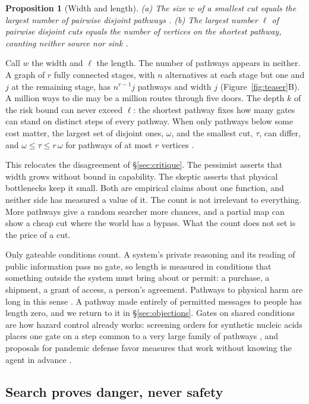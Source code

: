 \documentclass[10pt,twocolumn,letterpaper]{article}
\newtheorem{proposition}{Proposition}
\theoremstyle{definition}
\begin{document}
\begin{proposition}[Width and length]
\label{prop:graph}
(a) The size $w$ of a smallest cut equals the largest number of pairwise disjoint pathways \cite{menger,ford}. (b) The largest number $\ell$ of pairwise disjoint cuts equals the number of vertices on the shortest pathway, counting neither source nor sink \cite{robacker}.
\end{proposition}

Call $w$ the width and $\ell$ the length. The number of pathways appears in neither. A graph of $r$ fully connected stages, with $n$ alternatives at each stage but one and $j$ at the remaining stage, has $n^{r-1}j$ pathways and width $j$ (Figure~\ref{fig:teaser}B). A million ways to die may be a million routes through five doors. The depth $k$ of the risk bound can never exceed $\ell$: the shortest pathway fixes how many gates can stand on distinct steps of every pathway. When only pathways below some cost matter, the largest set of disjoint ones, $\omega$, and the smallest cut, $\tau$, can differ, and $\omega\le\tau\le r\,\omega$ for pathways of at most $r$ vertices \cite{lovasz}.

This relocates the disagreement of \S\ref{sec:critique}. The pessimist asserts that width grows without bound in capability. The skeptic asserts that physical bottlenecks keep it small. Both are empirical claims about one function, and neither side has measured a value of it. The count is not irrelevant to everything. More pathways give a random searcher more chances, and a partial map can show a cheap cut where the world has a bypass. What the count does not set is the price of a cut.

Only gateable conditions count. A system's private reasoning and its reading of public information pass no gate, so length is measured in conditions that something outside the system must bring about or permit: a purchase, a shipment, a grant of access, a person's agreement. Pathways to physical harm are long in this sense \cite{rand,hong}. A pathway made entirely of permitted messages to people has length zero, and we return to it in \S\ref{sec:objections}. Gates on shared conditions are how hazard control already works: screening orders for synthetic nucleic acids places one gate on a step common to a very large family of pathways \cite{hhs}, and proposals for pandemic defense favor measures that work without knowing the agent in advance \cite{esvelt}.

\subsection{Search proves danger, never safety}
\end{document}
